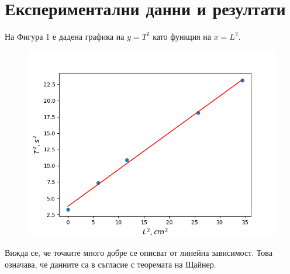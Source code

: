 \documentclass[aps, prb, twocolumn, a4paper, floatfix, reprint]{revtex4-2}
\begin{document}
\section{Експериментални данни и резултати}
На Фигура 1 е дадена графика на $y=T^2$ като функция на $x=L^2$. 
\begin{figure}[H]
    \centering
    \includegraphics[width=\columnwidth, keepaspectratio=true]{Figure_1.png} 
\end{figure}

Вижда се, че точките много добре се описват от линейна зависимост. Това означава, че данните са в съгласие с теоремата на Щайнер. 
\end{document}

